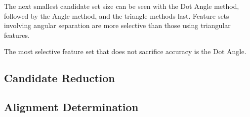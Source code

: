 The next smallest candidate set size can be seen with the Dot Angle method, followed by the Angle method, and the
triangle methods last.
Feature sets involving angular separation are more selective than those using triangular features.


The most selective feature set that does not sacrifice accuracy is the Dot Angle.

\subsection{Candidate Reduction}\label{subsec:candidateReductionResults}


\subsection{Alignment Determination}\label{subsec:alignmentDeterminationResults}


